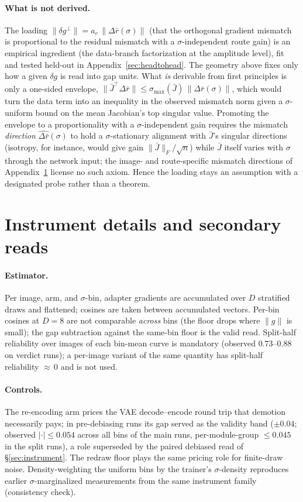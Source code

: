 \paragraph{What is not derived.} The loading
$\|\delta g^{\perp}\| = a_e\, \|\Delta\bar r(\sigma)\|$ (that the orthogonal
gradient mismatch is proportional to the residual mismatch with a
$\sigma$-independent route gain) is an empirical ingredient
(the data-branch factorization at the amplitude level), fit and tested
held-out in Appendix~\ref{sec:headtohead}. The geometry above fixes only how a
given $\delta g$ is read into gap units. What \emph{is} derivable from
first principles is only a one-sided envelope,
$\|\bar J^{\!\top}\Delta\bar r\| \le \sigma_{\max}(\bar J)\,
\|\Delta\bar r(\sigma)\|$, which would turn the data term into an
inequality in the observed mismatch norm given a $\sigma$-uniform bound
on the mean Jacobian's top
singular value. Promoting the envelope to a proportionality with a
$\sigma$-independent gain requires the mismatch \emph{direction}
$\widehat{\Delta\bar r}(\sigma)$ to hold a $\sigma$-stationary
alignment with $\bar J$'s singular directions (isotropy, for instance,
would give gain $\|\bar J\|_F/\sqrt{n}$) while $\bar J$ itself varies
with $\sigma$ through the network input; the image- and
route-specific mismatch directions of Appendix~\ref{app:instrument}
license no such axiom. Hence the loading stays an assumption with a
designated probe rather than a theorem.

\section{Instrument details and secondary reads}
\label{app:instrument}

\paragraph{Estimator.} Per image, arm, and $\sigma$-bin, adapter gradients
are accumulated over $D$ stratified draws and flattened; cosines are taken
between accumulated vectors. Per-bin cosines at $D{=}8$ are not comparable
\emph{across} bins (the floor drops where $\|g\|$ is small); the gap
subtraction against the same-bin floor is the valid read. Split-half
reliability over images of each bin-mean curve is mandatory
(observed $0.73$--$0.88$ on verdict runs); a per-image variant of the same
quantity has split-half reliability ${\approx}\,0$ and is not used.

\paragraph{Controls.} The re-encoding arm prices the VAE decode--encode
round trip that demotion necessarily pays; in pre-debiasing runs its gap
served as the validity band ($\pm 0.04$; observed $|\cdot| \le 0.054$
across all bins of the main runs, per-module-group $\le 0.045$ in the
split runs), a role superseded by the paired debiased read of
\S\ref{sec:instrument}. The redraw floor plays the same pricing role
for finite-draw noise.
Density-weighting the uniform bins by the trainer's $\sigma$-density
reproduces earlier $\sigma$-marginalized measurements from the same
instrument family (consistency check).

